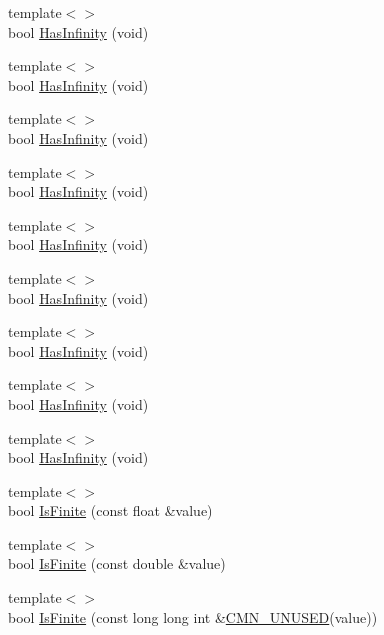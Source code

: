 \begin{DoxyCompactItemize}
{\footnotesize template$<$$>$ }\\bool \hyperlink{classcmn_type_traits_a6cda6cf5b9ff2d4ccf5e1fcd934e64b0}{Has\-Infinity} (void)
\item 
{\footnotesize template$<$$>$ }\\bool \hyperlink{classcmn_type_traits_a0c79f6aa5d2a5e62122064f499c9573a}{Has\-Infinity} (void)
\item 
{\footnotesize template$<$$>$ }\\bool \hyperlink{classcmn_type_traits_ac266cf990b2af31774d1c3e622be8d71}{Has\-Infinity} (void)
\item 
{\footnotesize template$<$$>$ }\\bool \hyperlink{classcmn_type_traits_aa280a48014460c82e28e306b854ddfba}{Has\-Infinity} (void)
\item 
{\footnotesize template$<$$>$ }\\bool \hyperlink{classcmn_type_traits_a5a4ce9063842cf1e4f32ac0a4200434c}{Has\-Infinity} (void)
\item 
{\footnotesize template$<$$>$ }\\bool \hyperlink{classcmn_type_traits_a636ab18b494eaad348b6f1a00ff7e61a}{Has\-Infinity} (void)
\item 
{\footnotesize template$<$$>$ }\\bool \hyperlink{classcmn_type_traits_ace3dad79fd9f9a12af249506bf490854}{Has\-Infinity} (void)
\item 
{\footnotesize template$<$$>$ }\\bool \hyperlink{classcmn_type_traits_a07e2ed4190907bbc9f2ba8481c3178df}{Has\-Infinity} (void)
\item 
{\footnotesize template$<$$>$ }\\bool \hyperlink{classcmn_type_traits_a86c9f722ff4b0d4d3089bed930dde31b}{Has\-Infinity} (void)
\item 
{\footnotesize template$<$$>$ }\\bool \hyperlink{classcmn_type_traits_a396dde53d2ce6a88e7d9004b849ab8d8}{Is\-Finite} (const float \&value)
\item 
{\footnotesize template$<$$>$ }\\bool \hyperlink{classcmn_type_traits_ae59ae17d0b0c9d93b33512381c2be9d4}{Is\-Finite} (const double \&value)
\item 
{\footnotesize template$<$$>$ }\\bool \hyperlink{classcmn_type_traits_a7bf1f83b4a1c429fd974f67a0bc76e3f}{Is\-Finite} (const long long int \&\hyperlink{cmn_portability_8h_a021894e2626935fa2305434b1e893ff6}{C\-M\-N\-\_\-\-U\-N\-U\-S\-E\-D}(value))

\end{DoxyCompactItemize}
